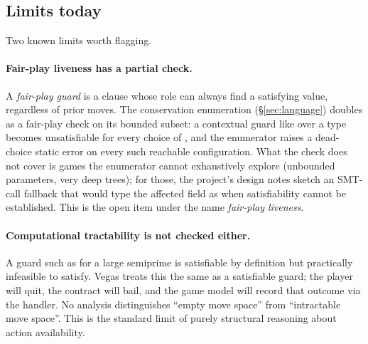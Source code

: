 \subsection{Limits today}

Two known limits worth flagging.

\paragraph{Fair-play liveness has a partial check.}  A
\emph{fair-play guard} is a  clause whose role can
always find a satisfying value, regardless of prior moves.  The
conservation enumeration (\S\ref{sec:language}) doubles as a
fair-play check on its bounded subset: a contextual guard like
over a type  becomes unsatisfiable for every
choice of , and the enumerator raises a dead-choice
static error on every such reachable configuration.  What the
check does not cover is games the enumerator cannot exhaustively
explore (unbounded  parameters, very deep trees); for
those, the project's design notes sketch an SMT-call fallback
that would type the affected field as  when
satisfiability cannot be established.  This is the open item
under the name \emph{fair-play liveness}.

\paragraph{Computational tractability is not checked either.}  A
guard such as  for a large semiprime  is
satisfiable by definition but practically infeasible to satisfy.
Vegas treats this the same as a satisfiable guard; the player
will quit, the contract will bail, and the game model will
record that outcome via the handler.  No analysis distinguishes
``empty move space'' from ``intractable move space''.  This is
the standard limit of purely structural reasoning about action
availability.
